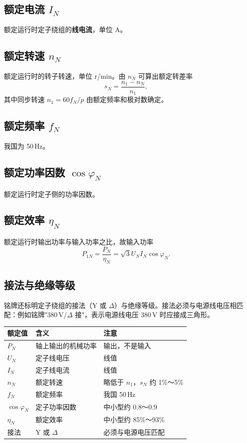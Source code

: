 \subsection{额定电流 $I_N$}
额定运行时定子绕组的\textbf{线电流}，单位 A。

\subsection{额定转速 $n_N$}
额定运行时的转子转速，单位 r/min。由 $n_N$ 可算出额定转差率
\begin{equation}
s_N=\frac{n_1-n_N}{n_1},
\end{equation}
其中同步转速 $n_1=60f_N/p$ 由额定频率和极对数确定。

\subsection{额定频率 $f_N$}
我国为 50\,Hz。

\subsection{额定功率因数 $\cos\varphi_N$}
额定运行时定子侧的功率因数。

\subsection{额定效率 $\eta_N$}
额定运行时输出功率与输入功率之比，故输入功率
\begin{equation}
P_{1N}=\frac{P_N}{\eta_N}=\sqrt3U_NI_N\cos\varphi_N .
\end{equation}


\subsection{接法与绝缘等级}
铭牌还标明定子绕组的接法（Y 或 $\Delta$）与绝缘等级。接法必须与电源线电压相匹配：例如铭牌"380\,V/$\Delta$ 接"，表示电源线电压 380\,V 时应接成三角形。

\begin{center}
\begin{tabular}{@{}lll@{}}
\toprule
额定值 & 含义 & 注意 \\
\midrule
$P_N$ & 轴上输出的机械功率 & 输出，不是输入 \\
$U_N$ & 定子线电压 & 线值 \\
$I_N$ & 定子线电流 & 线值 \\
$n_N$ & 额定转速 & 略低于 $n_1$，$s_N$ 约 1\%～5\% \\
$f_N$ & 额定频率 & 我国 50\,Hz \\
$\cos\varphi_N$ & 定子功率因数 & 中小型约 0.8～0.9 \\
$\eta_N$ & 额定效率 & 中小型约 85\%～93\% \\
接法 & Y 或 $\Delta$ & 必须与电源电压匹配 \\
\bottomrule
\end{tabular}
\end{center}

